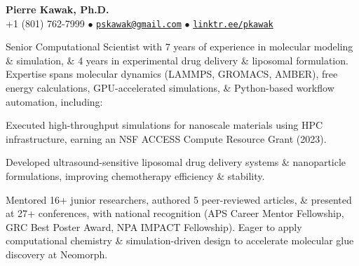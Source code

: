 \begin{center}
  {\LARGE \textbf{Pierre Kawak, Ph.D.} }\\[1ex]
  +1 (801) 762-7999 $\bullet$ \href{mailto:pskawak@gmail.com}{\tt pskawak@gmail.com} $\bullet$ \href{https://linktr.ee/pkawak}{\tt linktr.ee/pkawak}\\
\end{center}
\vspace{-0.1cm}
Senior Computational Scientist with 7 years of experience in molecular modeling \& simulation, \& 4 years in experimental drug delivery \& liposomal formulation. Expertise spans molecular dynamics (LAMMPS, GROMACS, AMBER), free energy calculations, GPU-accelerated simulations, \& Python-based workflow automation, including:
\vspace{-0.3\baselineskip}
\begin{tabitemize}
  \item Executed high-throughput simulations for nanoscale materials using HPC infrastructure, earning an NSF ACCESS Compute Resource Grant (2023).
  \item Developed ultrasound-sensitive liposomal drug delivery systems \& nanoparticle formulations, improving chemotherapy efficiency \& stability.
  \item Mentored 16+ junior researchers, authored 5 peer-reviewed articles, \& presented at 27+ conferences, with national recognition (APS Career Mentor Fellowship, GRC Best Poster Award, NPA IMPACT Fellowship). Eager to apply computational chemistry \& simulation-driven design to accelerate molecular glue discovery at Neomorph.
\end{tabitemize}
\vspace{-1.5\baselineskip}
